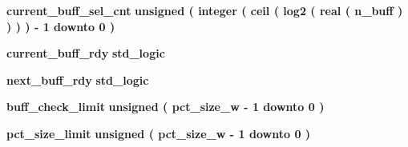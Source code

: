 \begin{DoxyCompactItemize}
{\bf current\+\_\+buff\+\_\+sel\+\_\+cnt} {\bfseries \textcolor{comment}{unsigned}\textcolor{vhdlchar}{ }\textcolor{vhdlchar}{(}\textcolor{vhdlchar}{ }\textcolor{vhdlchar}{ }\textcolor{vhdlchar}{ }\textcolor{vhdlchar}{ }\textcolor{comment}{integer}\textcolor{vhdlchar}{ }\textcolor{vhdlchar}{(}\textcolor{vhdlchar}{ }\textcolor{vhdlchar}{ceil}\textcolor{vhdlchar}{ }\textcolor{vhdlchar}{(}\textcolor{vhdlchar}{ }\textcolor{vhdlchar}{log2}\textcolor{vhdlchar}{ }\textcolor{vhdlchar}{(}\textcolor{vhdlchar}{ }\textcolor{comment}{real}\textcolor{vhdlchar}{ }\textcolor{vhdlchar}{(}\textcolor{vhdlchar}{ }{\bfseries {\bf n\+\_\+buff}} \textcolor{vhdlchar}{ }\textcolor{vhdlchar}{ }\textcolor{vhdlchar}{)}\textcolor{vhdlchar}{ }\textcolor{vhdlchar}{ }\textcolor{vhdlchar}{ }\textcolor{vhdlchar}{)}\textcolor{vhdlchar}{ }\textcolor{vhdlchar}{ }\textcolor{vhdlchar}{ }\textcolor{vhdlchar}{)}\textcolor{vhdlchar}{ }\textcolor{vhdlchar}{ }\textcolor{vhdlchar}{ }\textcolor{vhdlchar}{)}\textcolor{vhdlchar}{ }\textcolor{vhdlchar}{-\/}\textcolor{vhdlchar}{ } \textcolor{vhdldigit}{1} \textcolor{vhdlchar}{ }\textcolor{keywordflow}{downto}\textcolor{vhdlchar}{ }\textcolor{vhdlchar}{ } \textcolor{vhdldigit}{0} \textcolor{vhdlchar}{ }\textcolor{vhdlchar}{)}\textcolor{vhdlchar}{ }} 
\item 
{\bf current\+\_\+buff\+\_\+rdy} {\bfseries \textcolor{comment}{std\+\_\+logic}\textcolor{vhdlchar}{ }} 
\item 
{\bf next\+\_\+buff\+\_\+rdy} {\bfseries \textcolor{comment}{std\+\_\+logic}\textcolor{vhdlchar}{ }} 
\item 
{\bf buff\+\_\+check\+\_\+limit} {\bfseries \textcolor{comment}{unsigned}\textcolor{vhdlchar}{ }\textcolor{vhdlchar}{(}\textcolor{vhdlchar}{ }\textcolor{vhdlchar}{ }\textcolor{vhdlchar}{ }\textcolor{vhdlchar}{ }{\bfseries {\bf pct\+\_\+size\+\_\+w}} \textcolor{vhdlchar}{-\/}\textcolor{vhdlchar}{ } \textcolor{vhdldigit}{1} \textcolor{vhdlchar}{ }\textcolor{keywordflow}{downto}\textcolor{vhdlchar}{ }\textcolor{vhdlchar}{ } \textcolor{vhdldigit}{0} \textcolor{vhdlchar}{ }\textcolor{vhdlchar}{)}\textcolor{vhdlchar}{ }} 
\item 
{\bf pct\+\_\+size\+\_\+limit} {\bfseries \textcolor{comment}{unsigned}\textcolor{vhdlchar}{ }\textcolor{vhdlchar}{(}\textcolor{vhdlchar}{ }\textcolor{vhdlchar}{ }\textcolor{vhdlchar}{ }\textcolor{vhdlchar}{ }{\bfseries {\bf pct\+\_\+size\+\_\+w}} \textcolor{vhdlchar}{-\/}\textcolor{vhdlchar}{ } \textcolor{vhdldigit}{1} \textcolor{vhdlchar}{ }\textcolor{keywordflow}{downto}\textcolor{vhdlchar}{ }\textcolor{vhdlchar}{ } \textcolor{vhdldigit}{0} \textcolor{vhdlchar}{ }\textcolor{vhdlchar}{)}\textcolor{vhdlchar}{ }} 

\end{DoxyCompactItemize}
